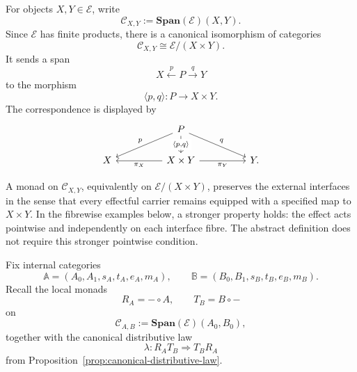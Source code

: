 For objects \(X,Y\in\mathcal E\), write
\[
    \mathcal C_{X,Y}
    :=
    \mathbf{Span}(\mathcal E)(X,Y).
\]
Since \(\mathcal E\) has finite products, there is a canonical isomorphism of
categories
\[
    \mathcal C_{X,Y}
    \cong
    \mathcal E/(X\times Y).
\]
It sends a span
\[
    X\xleftarrow{p}P\xrightarrow{q}Y
\]
to the morphism
\[
    \langle p,q\rangle:P\to X\times Y.
\]
The correspondence is displayed by
\[
    \begin{tikzcd}[column sep=huge]
            &
                P
                    \arrow[dl, "p"']
                    \arrow[dr, "q"]
                    \arrow[d, "{\langle p,q\rangle}" description]
            &
        \\
            X
            &
                X\times Y
                    \arrow[l, "\pi_X"]
                    \arrow[r, "\pi_Y"']
            &
                Y.
    \end{tikzcd}
\]

A monad on \(\mathcal C_{X,Y}\), equivalently on
\(\mathcal E/(X\times Y)\), preserves the external interfaces in the sense
that every effectful carrier remains equipped with a specified map to
\(X\times Y\). In the fibrewise examples below, a stronger property holds:
the effect acts pointwise and independently on each interface fibre. The
abstract definition does not require this stronger pointwise condition.

Fix internal categories
\[
    \mathbb A=(A_0,A_1,s_A,t_A,e_A,m_A),
    \qquad
    \mathbb B=(B_0,B_1,s_B,t_B,e_B,m_B).
\]
Recall the local monads
\[
    R_A=-\circ A,
    \qquad
    T_B=B\circ-
\]
on
\[
    \mathcal C_{A,B}
    :=
    \mathbf{Span}(\mathcal E)(A_0,B_0),
\]
together with the canonical distributive law
\[
    \lambda:
    R_AT_B
    \Rightarrow
    T_BR_A
\]
from Proposition~\ref{prop:canonical-distributive-law}.

